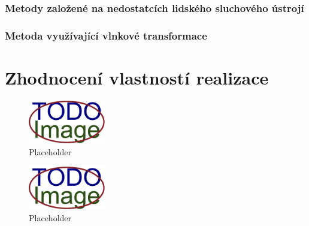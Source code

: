 
\blindtext

\subsection*{Metody založené na nedostatcích lidského sluchového ústrojí}
\label{sub:has-implementation}


\blindtext

\subsection*{Metoda využívající vlnkové transformace}
\label{sub:wavelet-transform-implementation}


\blindtext


\chapter{Zhodnocení vlastností realizace}
\label{cha:method-evaluation}


\blindtext

\blindtext

\begin{figure}[hbt]
    \centering
    \includegraphics[width=0.3\textwidth]{obrazky/placeholder.pdf}
    \caption{Placeholder}
    \label{pic:placeholder}
\end{figure}

\blindtext

\begin{figure}[hbt]
    \centering
    \includegraphics[width=0.3\textwidth]{obrazky/placeholder.pdf}
    \caption{Placeholder}
    \label{pic:placeholder}
\end{figure}


